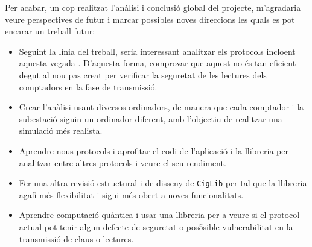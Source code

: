 \newpage
Per acabar, un cop realitzat l'anàlisi i conclusió global del projecte, m'agradaria veure perspectives de futur i marcar possibles noves direccions les quals es pot encarar un treball futur:
\begin{itemize}
	\item Seguint la línia del treball, seria interessant analitzar els protocols incloent aquesta vegada \cite{repair-busom}. D'aquesta forma, comprovar que aquest no és tan eficient degut al nou pas creat per verificar la seguretat de les lectures dels comptadors en la fase de transmissió.
	\item Crear l'anàlisi usant diversos ordinadors, de manera que cada comptador i la subestació siguin un ordinador diferent, amb l'objectiu de realitzar una simulació més realista.
	\item Aprendre nous protocols i aprofitar el codi de l'aplicació i la llibreria per analitzar entre altres protocols i veure el seu rendiment.
	\item Fer una altra revisió estructural i de disseny de \texttt{CigLib} per tal que la llibreria agafi més flexibilitat i sigui més obert a noves funcionalitats.
	\item Aprendre computació quàntica i usar una llibreria per a veure si el protocol actual pot tenir algun defecte de seguretat o pos5sible vulnerabilitat en la transmissió de claus o lectures.
\end{itemize}
